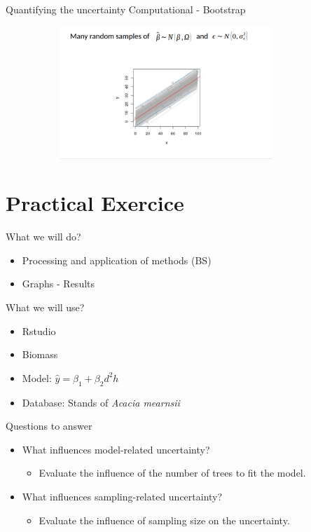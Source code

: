 \documentclass{beamer}
\begin{document}
\begin{frame}{Quantifying the uncertainty}
Computational - Bootstrap
\begin{figure}
        \centering
        \includegraphics[width = 10cm, height = 5cm]{pic/bootstrap2.jpg}
        \end{figure}      
\end{frame}

\section{Practical Exercice}
\begin{frame}{}
\begin{block}{What we will do?}
    \begin{itemize}
\item Processing and application of methods (BS)
\item Graphs - Results
    \end{itemize}
\end{block}
\begin{block}{What we will use?}
    \begin{itemize}
\item Rstudio
\item Biomass
\item Model: $\hat{y}=\beta_1+\beta_2 d^2h$ 
\item Database: Stands of \textit{Acacia mearnsii}
    \end{itemize}
\end{block}
\end{frame}


\begin{frame}
\begin{block}{Questions to answer}
       \begin{itemize}
           \item What influences model-related uncertainty?
             \begin{itemize}
           \item Evaluate the influence of the number of trees to fit the model.
       \end{itemize}
        \end{itemize}
\begin{itemize}
    \item What influences sampling-related uncertainty?
    \begin{itemize}
        \item Evaluate the influence of sampling size on the uncertainty.
    \end{itemize}
 \end{itemize}
\end{block} 
\end{frame}
\end{document}
